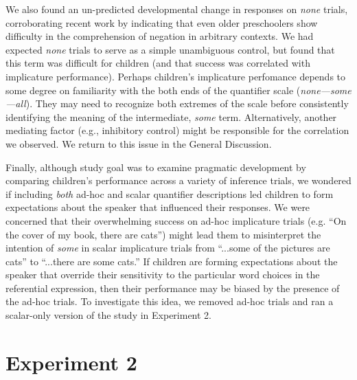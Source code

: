 \documentclass[10pt,letterpaper]{article}
\begin{document}
We also found an un-predicted developmental change in responses on \emph{none} trials, corroborating recent work by \cite{nordmeyer2014} indicating that even older preschoolers show difficulty in the comprehension of negation in arbitrary contexts. We had expected \emph{none} trials to serve as a simple unambiguous control, but found that this term was difficult for children (and that success was correlated with implicature performance). Perhaps children's implicature perfomance depends to some degree on familiarity with the both ends of the quantifier scale (\emph{none---some---all}). They may need to recognize both extremes of the scale before consistently identifying the meaning of the intermediate, \emph{some} term. Alternatively, another mediating factor (e.g., inhibitory control) might be responsible for the correlation we observed. We return to this issue in the General Discussion.


Finally, although study goal was to examine pragmatic development by comparing children's performance across a variety of inference trials, we wondered if including \emph{both} ad-hoc and scalar quantifier descriptions led children to form expectations about the speaker that influenced their responses. We were concerned that their overwhelming success on ad-hoc implicature trials (e.g. ``On the cover of my book, there are cats'') might lead them to misinterpret the intention of \emph{some} in scalar implicature trials from ``...some of the pictures are cats'' to ``...there are some cats.'' If children are forming expectations about the speaker that override their sensitivity to the particular word choices in the referential expression, then their performance may be biased by the presence of the ad-hoc trials.  To investigate this idea, we removed ad-hoc trials and ran a scalar-only version of the study in Experiment 2.

\section{Experiment 2} 

\end{document}
